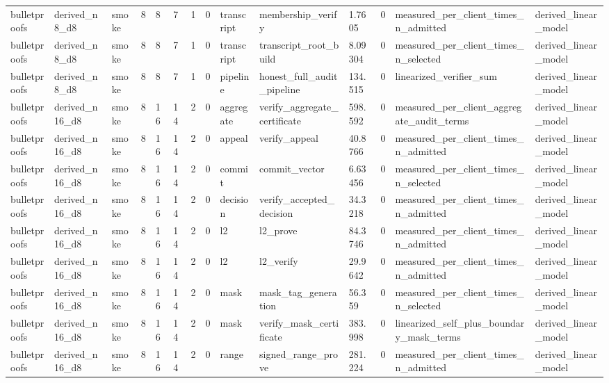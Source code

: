 \begin{table}[t]
\begin{tabular}{llllllllllllll}
bulletproofs & derived\_n8\_d8 & smoke & 8 & 8 & 7 & 1 & 0 & transcript & membership\_verify & 1.7605 & 0 & measured\_per\_client\_times\_n\_admitted & derived\_linear\_model \\
bulletproofs & derived\_n8\_d8 & smoke & 8 & 8 & 7 & 1 & 0 & transcript & transcript\_root\_build & 8.09304 & 0 & measured\_per\_client\_times\_n\_selected & derived\_linear\_model \\
bulletproofs & derived\_n8\_d8 & smoke & 8 & 8 & 7 & 1 & 0 & pipeline & honest\_full\_audit\_pipeline & 134.515 & 0 & linearized\_verifier\_sum & derived\_linear\_model \\
bulletproofs & derived\_n16\_d8 & smoke & 8 & 16 & 14 & 2 & 0 & aggregate & verify\_aggregate\_certificate & 598.592 & 0 & measured\_per\_client\_aggregate\_audit\_terms & derived\_linear\_model \\
bulletproofs & derived\_n16\_d8 & smoke & 8 & 16 & 14 & 2 & 0 & appeal & verify\_appeal & 40.8766 & 0 & measured\_per\_client\_times\_n\_admitted & derived\_linear\_model \\
bulletproofs & derived\_n16\_d8 & smoke & 8 & 16 & 14 & 2 & 0 & commit & commit\_vector & 6.63456 & 0 & measured\_per\_client\_times\_n\_selected & derived\_linear\_model \\
bulletproofs & derived\_n16\_d8 & smoke & 8 & 16 & 14 & 2 & 0 & decision & verify\_accepted\_decision & 34.3218 & 0 & measured\_per\_client\_times\_n\_admitted & derived\_linear\_model \\
bulletproofs & derived\_n16\_d8 & smoke & 8 & 16 & 14 & 2 & 0 & l2 & l2\_prove & 84.3746 & 0 & measured\_per\_client\_times\_n\_admitted & derived\_linear\_model \\
bulletproofs & derived\_n16\_d8 & smoke & 8 & 16 & 14 & 2 & 0 & l2 & l2\_verify & 29.9642 & 0 & measured\_per\_client\_times\_n\_admitted & derived\_linear\_model \\
bulletproofs & derived\_n16\_d8 & smoke & 8 & 16 & 14 & 2 & 0 & mask & mask\_tag\_generation & 56.359 & 0 & measured\_per\_client\_times\_n\_selected & derived\_linear\_model \\
bulletproofs & derived\_n16\_d8 & smoke & 8 & 16 & 14 & 2 & 0 & mask & verify\_mask\_certificate & 383.998 & 0 & linearized\_self\_plus\_boundary\_mask\_terms & derived\_linear\_model \\
bulletproofs & derived\_n16\_d8 & smoke & 8 & 16 & 14 & 2 & 0 & range & signed\_range\_prove & 281.224 & 0 & measured\_per\_client\_times\_n\_admitted & derived\_linear\_model \\

\end{tabular}
\end{table}
